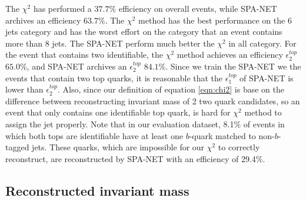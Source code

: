 The $\chi^{2}$ has performed a $37.7\%$ efficiency on overall events, while SPA-NET archives an efficiency $63.7\%$. The $\chi^{2}$ method has the best performance on the 6 jets category and has the worst effort on the category that an event contains more than 8 jets. The SPA-NET perform much better the $\chi^{2}$ in all category. For the event that contains two identifiable, the $\chi^{2}$ method achieves an efficiency $\epsilon^{top}_{2}$ $65.0\%$, and SPA-NET archives an $\epsilon^{top}_{2}$ $84.1\%$. Since we train the SPA-NET we the events that contain two top quarks, it is reasonable that the $\epsilon^{top}_{1}$ of SPA-NET is lower than $\epsilon^{top}_{2}$. Also, since our definition of equation \ref{eqn:chi2} is base on the difference between reconstructing invariant mass of 2 two quark candidates, so an event that only contains one identifiable top quark, is hard for $\chi^{2}$ method to assign the jet properly. Note that in our evaluation dataset, 8.1\% of events in which both tops are identifiable have at least one $b$-quark matched to non-$b$-tagged jets. These quarks, which are impossible for our $\chi^2$ to correctly reconstruct, are reconstructed by SPA-NET with an efficiency of 29.4\%. 

\subsection{Reconstructed invariant mass }\label{subsec:reco inv mass }

